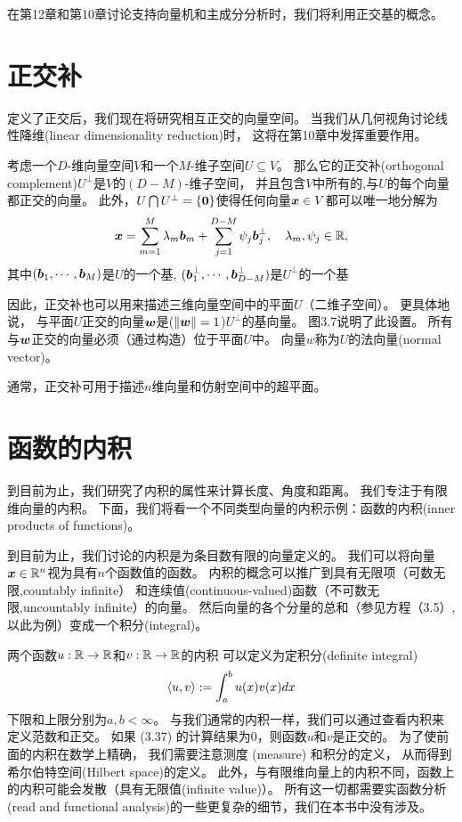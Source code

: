 在第12章和第10章讨论支持向量机和主成分分析时，我们将利用正交基的概念。

\section{正交补}
定义了正交后，我们现在将研究相互正交的向量空间。
当我们从几何视角讨论线性降维(linear dimensionality reduction)时，
这将在第10章中发挥重要作用。

考虑一个$D$-维向量空间$V$和一个$M$-维子空间$U \subseteq V$。
那么它的正交补(orthogonal complement)$U^\perp$是$V$的$(D-M)$-维子空间，
并且包含$V$中所有的,与$U$的每个向量都正交的向量。
此外，$U \bigcap U^\perp = \{\boldsymbol{0}\}$使得任何向量$\boldsymbol{x} \in V$都可以唯一地分解为
\begin{equation}
    \boldsymbol{x} = \sum_{m=1}^{M}\lambda_m\boldsymbol{b}_m
    + \sum_{j=1}^{D-M}\psi_j\boldsymbol{b}_j^\perp,\quad
    \lambda_m,\psi_j \in \mathbb{R},
\end{equation}
其中$(\boldsymbol{b}_1,\cdots,\boldsymbol{b}_M)$是$U$的一个基,
$(\boldsymbol{b}_1^\perp,\cdots,\boldsymbol{b}_{D-M}^\perp)$是$U^\perp$的一个基

因此，正交补也可以用来描述三维向量空间中的平面$U$（二维子空间）。
更具体地说，
与平面$U$正交的向量$\boldsymbol{w}$是($\|\boldsymbol{w}\| = 1$)$U^\perp$的基向量。
图3.7说明了此设置。
所有与$\boldsymbol{w}$正交的向量必须（通过构造）位于平面$U$中。
向量$w$称为$U$的法向量(normal vector)。

通常，正交补可用于描述$n$维向量和仿射空间中的超平面。

\section{函数的内积}
到目前为止，我们研究了内积的属性来计算长度、角度和距离。
我们专注于有限维向量的内积。
下面，我们将看一个不同类型向量的内积示例：函数的内积(inner products of functions)。

到目前为止，我们讨论的内积是为条目数有限的向量定义的。
我们可以将向量$\boldsymbol{x} \in \mathbb{R}^n$视为具有$n$个函数值的函数。
内积的概念可以推广到具有无限项（可数无限,countably infinite）
和连续值(continuous-valued)函数（不可数无限,uncountably infinite）的向量。
然后向量的各个分量的总和（参见方程（3.5）,以此为例）变成一个积分(integral)。

两个函数$u:\mathbb{R} \rightarrow \mathbb{R}$和$v:\mathbb{R} \rightarrow \mathbb{R}$的内积
可以定义为定积分(definite integral)
\begin{equation}
    \left\langle u,v\right\rangle := \int_a^b u(x)v(x)dx
\end{equation}
下限和上限分别为$a,b < \infty$。
与我们通常的内积一样，我们可以通过查看内积来定义范数和正交。
如果 (3.37) 的计算结果为$0$，则函数$u$和$v$是正交的。
为了使前面的内积在数学上精确，
我们需要注意测度 (measure) 和积分的定义，
从而得到希尔伯特空间(Hilbert space)的定义。
此外，与有限维向量上的内积不同，函数上的内积可能会发散（具有无限值(infinite value)）。
所有这一切都需要实函数分析(read and functional analysis)的一些更复杂的细节，我们在本书中没有涉及。

